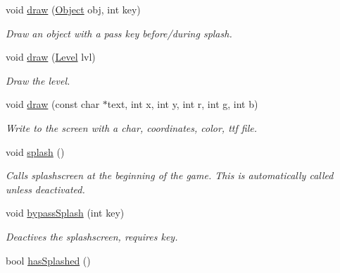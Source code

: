 \begin{DoxyCompactItemize}
\item 
void \hyperlink{classEngine_a81d89df09ee2577fd7deaf2f5e27f93a}{draw} (\hyperlink{classObject}{Object} obj, int key)\hypertarget{classEngine_a81d89df09ee2577fd7deaf2f5e27f93a}{}\label{classEngine_a81d89df09ee2577fd7deaf2f5e27f93a}

\begin{DoxyCompactList}\small\item\em Draw an object with a pass key before/during splash. \end{DoxyCompactList}\item 
void \hyperlink{classEngine_a9435c9399f0d3952032c106e7ee8f6e9}{draw} (\hyperlink{classLevel}{Level} lvl)\hypertarget{classEngine_a9435c9399f0d3952032c106e7ee8f6e9}{}\label{classEngine_a9435c9399f0d3952032c106e7ee8f6e9}

\begin{DoxyCompactList}\small\item\em Draw the level. \end{DoxyCompactList}\item 
void \hyperlink{classEngine_acfa5f40b14195633d084fdb54deffcc9}{draw} (const char $\ast$text, int x, int y, int r, int g, int b)\hypertarget{classEngine_acfa5f40b14195633d084fdb54deffcc9}{}\label{classEngine_acfa5f40b14195633d084fdb54deffcc9}

\begin{DoxyCompactList}\small\item\em Write to the screen with a char, coordinates, color, ttf file. \end{DoxyCompactList}\item 
void \hyperlink{classEngine_adb6f1426c5c57f9d60be1e10d8eb2506}{splash} ()\hypertarget{classEngine_adb6f1426c5c57f9d60be1e10d8eb2506}{}\label{classEngine_adb6f1426c5c57f9d60be1e10d8eb2506}

\begin{DoxyCompactList}\small\item\em Calls splashscreen at the beginning of the game. This is automatically called unless deactivated. \end{DoxyCompactList}\item 
void \hyperlink{classEngine_a3b9cf8a050f43e4e185748f7b2a3ded8}{bypass\+Splash} (int key)\hypertarget{classEngine_a3b9cf8a050f43e4e185748f7b2a3ded8}{}\label{classEngine_a3b9cf8a050f43e4e185748f7b2a3ded8}

\begin{DoxyCompactList}\small\item\em Deactives the splashscreen, requires key. \end{DoxyCompactList}\item 
bool \hyperlink{classEngine_aabab82c2ba4dca772a28dbbd4fe08cb4}{has\+Splashed} ()\hypertarget{classEngine_aabab82c2ba4dca772a28dbbd4fe08cb4}{}\label{classEngine_aabab82c2ba4dca772a28dbbd4fe08cb4}


\end{DoxyCompactItemize}
